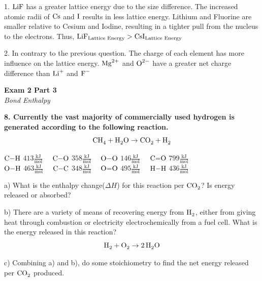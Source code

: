 \documentclass{article}
\begin{document}
    1. $\ce{LiF}$ has a greater lattice energy due to the size difference. The increased atomic radii of $\ce{Cs}$ and $\ce{I}$ results in less lattice energy. Lithium and Fluorine are smaller relative to Cesium and Iodine, resulting in a tighter pull from the nucleus to the electrons. Thus, $\ce{LiF}_{\text{Lattice Energy}} > \ce{CsI}_{\text{Lattice Energy}}$

    2. In contrary to the previous question. The charge of each element has more influence on the lattice energy. $\ce{Mg^{2+}}$ and $\ce{O^{2-}}$ have a greater net charge difference than $\ce{Li^{+}}$ and $\ce{F^{-}}$
    \pagebreak

    \begin{center}
        \textbf{Exam 2 Part 3}\\
        \textit{Bond Enthalpy}
    \end{center}
    \textbf{8. Currently the vast majority of commercially used hydrogen is generated according to the following reaction.}
    $$\ce{CH4} + \ce{H2O} \rightarrow \ce{CO2} + \ce{H2}$$
    \begin{center}
        $\ce{C-H}$ $413 \frac{\si{\kilo\joule}}{\si{\mol}} \quad$
        $\ce{C-O}$ $358 \frac{\si{\kilo\joule}}{\si{\mol}} \quad$
        $\ce{O-O}$ $146 \frac{\si{\kilo\joule}}{\si{\mol}} \quad$
        $\ce{C=O}$ $799 \frac{\si{\kilo\joule}}{\si{\mol}}$\\[.2cm]
        $\ce{O-H}$ $463 \frac{\si{\kilo\joule}}{\si{\mol}} \quad$
        $\ce{C-C}$ $348 \frac{\si{\kilo\joule}}{\si{\mol}} \quad$
        $\ce{O=O}$ $495 \frac{\si{\kilo\joule}}{\si{\mol}} \quad$
        $\ce{H-H}$ $436 \frac{\si{\kilo\joule}}{\si{\mol}}$
    \end{center}

    a) What is the enthalpy change($\Delta H$) for this reaction per $\ce{CO2}$? Is energy released or absorbed?

    b) There are a variety of means of recovering energy from $\ce{H2}$, either from giving heat through combustion or electricity electrochemically from a fuel cell. What is the energy released in this reaction?
    $$\ce{H2} + \ce{O2} \rightarrow \ce{2H2O}$$

    c) Combining a) and b), do some stoichiometry to find the net energy released per $\ce{CO2}$ produced.
    \pagebreak
\end{document}
